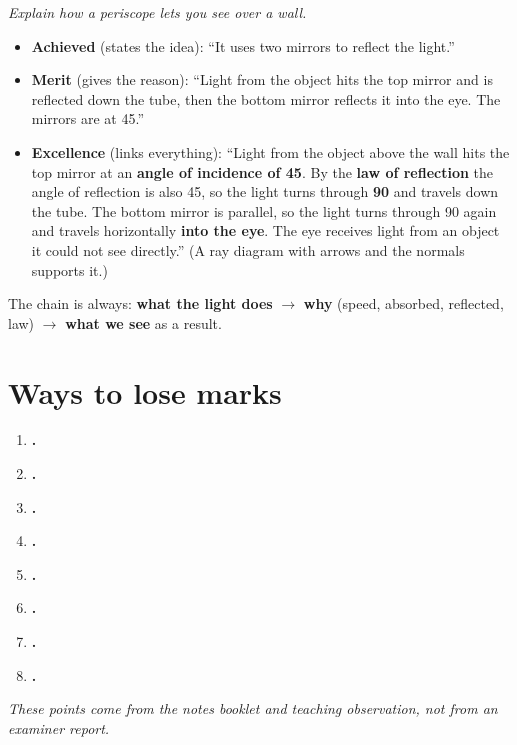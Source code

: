 \documentclass[11pt]{article}
\begin{document}
\emph{Explain how a periscope lets you see over a wall.}
\begin{itemize}
\item \textbf{Achieved} (states the idea): ``It uses two mirrors to reflect the light.''
\item \textbf{Merit} (gives the reason): ``Light from the object hits the top mirror and is reflected down the tube, then the bottom mirror reflects it into the eye. The mirrors are at 45\textdegree.''
\item \textbf{Excellence} (links everything): ``Light from the object above the wall hits the top mirror at an \textbf{angle of incidence of 45\textdegree}. By the \textbf{law of reflection} the angle of reflection is also 45\textdegree, so the light turns through \textbf{90\textdegree} and travels down the tube. The bottom mirror is parallel, so the light turns through 90\textdegree{} again and travels horizontally \textbf{into the eye}. The eye receives light from an object it could not see directly.'' (A ray diagram with arrows and the normals supports it.)
\end{itemize}
The chain is always: \textbf{what the light does} $\to$ \textbf{why} (speed, absorbed, reflected, law) $\to$ \textbf{what we see} as a result.

\section{Ways to lose marks}\label{sec:lose}
\begin{enumerate}[label=\textbf{L\arabic*}, leftmargin=9mm]
\item \textbf{.} 
\item \textbf{.} 
\item \textbf{.} 
\item \textbf{.} 
\item \textbf{.} 
\item \textbf{.} 
\item \textbf{.} 
\item \textbf{.} 
\end{enumerate}
{\small\emph{These points come from the notes booklet and teaching observation, not from an examiner report.}}
\end{document}
